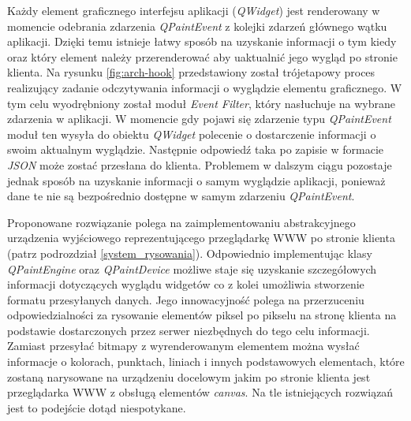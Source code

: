 
Każdy element graficznego interfejsu aplikacji (\emph{QWidget}) jest renderowany w momencie odebrania zdarzenia \emph{QPaintEvent} z kolejki zdarzeń głównego wątku aplikacji. Dzięki temu istnieje łatwy sposób na uzyskanie informacji o tym kiedy oraz który element należy przerenderować aby uaktualnić jego wygląd po stronie klienta. Na rysunku \ref{fig:arch-hook} przedstawiony został trójetapowy proces realizujący zadanie odczytywania informacji o wyglądzie elementu graficznego. 
W tym celu wyodrębniony został moduł \emph{Event Filter}, który nasłuchuje na wybrane zdarzenia w aplikacji. W momencie gdy pojawi się zdarzenie typu \emph{QPaintEvent} moduł ten wysyła do obiektu \emph{QWidget} polecenie o dostarczenie informacji o swoim aktualnym wyglądzie. Następnie odpowiedź taka po zapisie w formacie \emph{JSON} może zostać przesłana do klienta. Problemem w dalszym ciągu pozostaje jednak sposób na uzyskanie informacji o samym wyglądzie aplikacji, ponieważ dane te nie są bezpośrednio dostępne w samym zdarzeniu \emph{QPaintEvent}.

Proponowane rozwiązanie polega na zaimplementowaniu abstrakcyjnego urządzenia wyjściowego reprezentującego przeglądarkę WWW po stronie klienta (patrz podrozdział \ref{system_rysowania}). Odpowiednio implementując klasy \emph{QPaintEngine} oraz \emph{QPaintDevice} możliwe staje się uzyskanie szczegółowych informacji dotyczących wyglądu widgetów co z kolei umożliwia stworzenie formatu przesyłanych danych. Jego innowacyjność polega na przerzuceniu odpowiedzialności za rysowanie elementów piksel po pikselu na stronę klienta na podstawie dostarczonych przez serwer niezbędnych do tego celu informacji. Zamiast przesyłać bitmapy z wyrenderowanym elementem można wysłać informacje o kolorach, punktach, liniach i innych podstawowych elementach, które zostaną narysowane na urządzeniu docelowym jakim po stronie klienta jest przeglądarka WWW z obsługą elementów \emph{canvas}. Na tle istniejących rozwiązań jest to podejście dotąd niespotykane.
